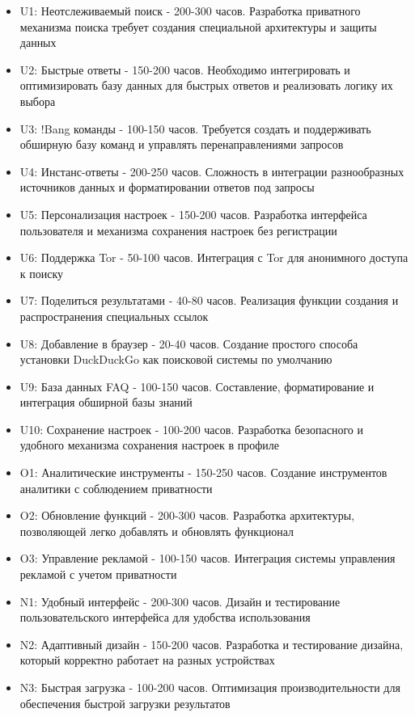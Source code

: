 \documentclass[12pt,a4paper]{article}
\begin{document}
\begin{itemize}
    \item U1: Неотслеживаемый поиск - 200-300 часов. Разработка приватного механизма поиска требует создания специальной архитектуры и защиты данных
    \item U2: Быстрые ответы - 150-200 часов. Необходимо интегрировать и оптимизировать базу данных для быстрых ответов и реализовать логику их выбора
    \item U3: !Bang команды - 100-150 часов. Требуется создать и поддерживать обширную базу команд и управлять перенаправлениями запросов
    \item U4: Инстанс-ответы - 200-250 часов. Сложность в интеграции разнообразных источников данных и форматировании ответов под запросы
    \item U5: Персонализация настроек - 150-200 часов. Разработка интерфейса пользователя и механизма сохранения настроек без регистрации
    \item U6: Поддержка Tor - 50-100 часов. Интеграция с Tor для анонимного доступа к поиску
    \item U7: Поделиться результатами - 40-80 часов. Реализация функции создания и распространения специальных ссылок
    \item U8: Добавление в браузер - 20-40 часов. Создание простого способа установки DuckDuckGo как поисковой системы по умолчанию
    \item U9: База данных FAQ - 100-150 часов. Составление, форматирование и интеграция обширной базы знаний
    \item U10: Сохранение настроек - 100-200 часов. Разработка безопасного и удобного механизма сохранения настроек в профиле
    \item O1: Аналитические инструменты - 150-250 часов. Создание инструментов аналитики с соблюдением приватности
    \item O2: Обновление функций - 200-300 часов. Разработка архитектуры, позволяющей легко добавлять и обновлять функционал
    \item O3: Управление рекламой - 100-150 часов. Интеграция системы управления рекламой с учетом приватности
    \item N1: Удобный интерфейс - 200-300 часов. Дизайн и тестирование пользовательского интерфейса для удобства использования
    \item N2: Адаптивный дизайн - 150-200 часов. Разработка и тестирование дизайна, который корректно работает на разных устройствах
    \item N3: Быстрая загрузка - 100-200 часов. Оптимизация производительности для обеспечения быстрой загрузки результатов

\end{itemize}
\end{document}
